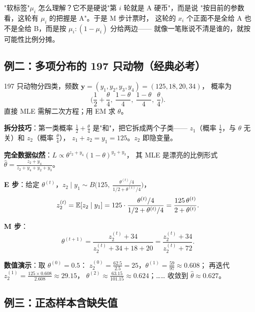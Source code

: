 \begin{pbox}
"软标签"$\mu_i$ 怎么理解？它不是硬说"第 $i$ 轮就是 A 硬币"，而是说
"按目前的参数看，这轮有 $\mu_i$ 的把握是 A"。于是 M 步计票时，
这轮的 $x_i$ 个正面不是全给 A 也不是全给 B，而是按 $\mu_i:(1-\mu_i)$ 分给两边——
就像一笔账说不清是谁的，就按可能性比例分摊。
\end{pbox}

\subsection{例二：多项分布的 197 只动物（经典必考）}

\begin{exbox}
197 只动物分四类，频数 $\bm y=(y_1,y_2,y_3,y_4)=(125,18,20,34)$，
概率为
\[
\Big(\frac12+\frac\theta4,\ \frac{1-\theta}4,\ \frac{1-\theta}4,\ \frac\theta4\Big).
\]
直接 MLE 需解二次方程；用 EM 求 $\theta$。
\end{exbox}
\begin{sol}
\textbf{拆分技巧}：第一类概率 $\frac12+\frac\theta4$ 是"和"，把它拆成两个子类——
$z_1$（概率 $\frac12$，与 $\theta$ 无关）和 $z_2$（概率 $\frac\theta4$），
$z_1+z_2=y_1=125$。$z_2$ 即隐变量。

\textbf{完全数据似然}：$L\propto\theta^{z_2+y_4}(1-\theta)^{y_2+y_3}$，
其 MLE 是漂亮的比例形式 $\hat\theta=\frac{z_2+y_4}{z_2+y_4+y_2+y_3}$。

\textbf{E 步}：给定 $\theta^{(t)}$，$z_2\mid y_1\sim B\big(125,\ \frac{\theta^{(t)}/4}{1/2+\theta^{(t)}/4}\big)$，
\[
z_2^{(t)}=\mathbb{E}[z_2\mid y_1]=125\cdot\frac{\theta^{(t)}/4}{1/2+\theta^{(t)}/4}
=\frac{125\,\theta^{(t)}}{2+\theta^{(t)}}.
\]

\textbf{M 步}：
\[
\theta^{(t+1)}=\frac{z_2^{(t)}+34}{z_2^{(t)}+34+18+20}=\frac{z_2^{(t)}+34}{z_2^{(t)}+72}.
\]

\textbf{数值演示}：取 $\theta^{(0)}=0.5$：
$z_2^{(0)}=\frac{62.5}{2.5}=25$，$\theta^{(1)}=\frac{59}{97}\approx0.608$；
再迭代 $z_2^{(1)}=\frac{125\times0.608}{2.608}\approx29.15$，
$\theta^{(2)}\approx\frac{63.15}{101.15}\approx0.624$；……
收敛到 $\hat\theta\approx0.627$。
\end{sol}

\subsection{例三：正态样本含缺失值}

